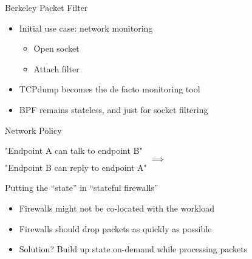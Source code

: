 \documentclass[black,white]{beamer}
\begin{document}
    \begin{frame}{Berkeley Packet Filter}
        \begin{itemize}
            \item Initial use case: network monitoring \medskip %
                \begin{itemize}
                    \item Open socket \medskip
                    \item Attach filter \medskip
                \end{itemize}
            \item TCPdump becomes the de facto monitoring tool \medskip
            \item BPF remains stateless, and just for socket filtering
        \end{itemize}
    \end{frame}

    \begin{frame}{Network Policy}
        \begin{center}
        "Endpoint A can talk to endpoint B"%
            \[\implies\]
        "Endpoint B can reply to endpoint A"
        \end{center}
    \end{frame}

    \begin{frame}{Putting the ``state'' in ``stateful firewalls''}
        \begin{itemize}
             \item Firewalls might not be co-located with the workload \medskip
             \item Firewalls should drop packets as quickly as possible \medskip
             \item Solution? Build up state on-demand while processing packets \medskip
        \end{itemize}
    \end{frame}
\end{document}
